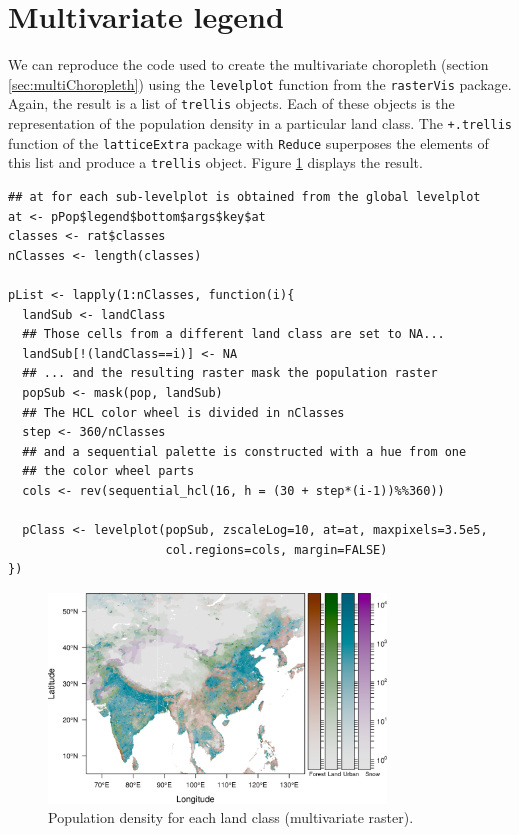 \section{\floweroneleft  Multivariate legend}
\label{sec-3}

We can reproduce the code used to create the multivariate
choropleth (section \ref{sec:multiChoropleth}) using the
\texttt{levelplot} function from the \texttt{rasterVis} package. Again, the
result is a list of \texttt{trellis} objects. Each of these objects is
the representation of the population density in a particular land
class. The \texttt{+.trellis} function of the \texttt{latticeExtra} package with
\texttt{Reduce} superposes the elements of this list and produce a
\texttt{trellis} object. Figure \ref{fig:popLandClass} displays the
result.

  



\lstset{language=R}
\begin{lstlisting}
## at for each sub-levelplot is obtained from the global levelplot
at <- pPop$legend$bottom$args$key$at
classes <- rat$classes
nClasses <- length(classes)

pList <- lapply(1:nClasses, function(i){
  landSub <- landClass
  ## Those cells from a different land class are set to NA...
  landSub[!(landClass==i)] <- NA
  ## ... and the resulting raster mask the population raster
  popSub <- mask(pop, landSub)
  ## The HCL color wheel is divided in nClasses
  step <- 360/nClasses
  ## and a sequential palette is constructed with a hue from one
  ## the color wheel parts
  cols <- rev(sequential_hcl(16, h = (30 + step*(i-1))%%360))

  pClass <- levelplot(popSub, zscaleLog=10, at=at, maxpixels=3.5e5,
                      col.regions=cols, margin=FALSE)
})
\end{lstlisting}



\begin{figure}[h!]
\centering
\includegraphics[width=0.8\textwidth]{figs/popLandClass.png}
\caption{\label{fig:popLandClass}Population density for each land class (multivariate raster).}
\end{figure}
